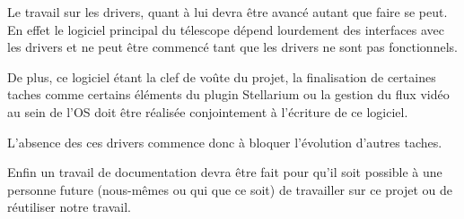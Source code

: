 \vspace{1cm}

Le travail sur les drivers, quant à lui devra être avancé autant que faire se peut. En effet le logiciel principal du télescope dépend lourdement des interfaces avec les drivers et ne peut être commencé tant que les drivers ne sont pas fonctionnels.

De plus, ce logiciel étant la clef de voûte du projet, la finalisation de certaines taches comme certains éléments du plugin Stellarium ou la gestion du flux vidéo au sein de l'OS doit être réalisée conjointement à l'écriture de ce logiciel.

L'absence des ces drivers commence donc à bloquer l'évolution d'autres taches.

\vspace{1cm}

Enfin un travail de documentation devra être fait pour qu'il soit possible à une personne future (nous-mêmes ou qui que ce soit) de travailler sur ce projet ou de réutiliser notre travail.




